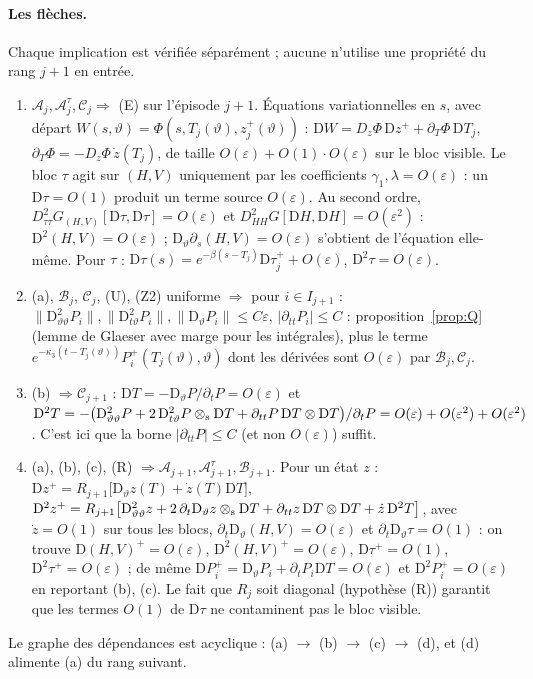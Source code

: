 \documentclass[11pt,a4paper]{article}
\theoremstyle{remark}
\newcommand{\vth}{\vartheta}
\newcommand{\D}{\mathrm D}
\begin{document}
\paragraph{Les flèches.} Chaque implication est vérifiée séparément ; aucune n'utilise une propriété du rang $j+1$ en entrée.
\begin{enumerate}[label=(\alph*),nosep]
\item $\mathcal A_j,\mathcal A^\tau_j,\mathcal C_j\Rightarrow$ (E) sur l'épisode $j+1$. Équations variationnelles en $s$, avec départ $W(s,\vth)=\Phi(s,T_j(\vth),z_j^+(\vth))$ : $\D W=D_z\Phi\,\D z^++\partial_T\Phi\,\D T_j$, $\partial_T\Phi=-D_z\Phi\,\dot z(T_j)$, de taille $O(\varepsilon)+O(1)\cdot O(\varepsilon)$ sur le bloc visible. Le bloc $\tau$ agit sur $(H,V)$ uniquement par les coefficients $\gamma_1,\lambda=O(\varepsilon)$ : un $\D\tau=O(1)$ produit un terme source $O(\varepsilon)$. Au second ordre, $D^2_{\tau\tau}G_{(H,V)}[\D\tau,\D\tau]=O(\varepsilon)$ et $D^2_{HH}G[\D H,\D H]=O(\varepsilon^2)$ : $\D^2(H,V)=O(\varepsilon)$ ; $\D_\vth\partial_s(H,V)=O(\varepsilon)$ s'obtient de l'équation elle-même. Pour $\tau$ : $\D\tau(s)=e^{-\beta(s-T_j)}\D\tau_j^++O(\varepsilon)$, $\D^2\tau=O(\varepsilon)$.
\item (a), $\mathcal B_j$, $\mathcal C_j$, (U), (Z2) uniforme $\Rightarrow$ pour $i\in I_{j+1}$ : $\lVert\D^2_{\vth\vth}P_i\rVert,\lVert\D^2_{t\vth}P_i\rVert,\lVert\D_\vth P_i\rVert\le C\varepsilon$, $\lvert\partial_{tt}P_i\rvert\le C$ : proposition~\ref{prop:Q} (lemme de Glaeser avec marge pour les intégrales), plus le terme $e^{-\kappa_3(t-T_j(\vth))}P_i^+(T_j(\vth),\vth)$ dont les dérivées sont $O(\varepsilon)$ par $\mathcal B_j,\mathcal C_j$.
\item (b) $\Rightarrow\mathcal C_{j+1}$ : $\D T=-\D_\vth P/\partial_tP=O(\varepsilon)$ et $\D^2T=-\bigl(\D^2_{\vth\vth}P+2\,\D^2_{t\vth}P\otimes_{\rm s}\D T+\partial_{tt}P\,\D T\otimes\D T\bigr)/\partial_tP=O(\varepsilon)+O(\varepsilon^2)+O(\varepsilon^2)$. C'est ici que la borne $\lvert\partial_{tt}P\rvert\le C$ (et non $O(\varepsilon)$) suffit.
\item (a), (b), (c), (R) $\Rightarrow\mathcal A_{j+1},\mathcal A^\tau_{j+1},\mathcal B_{j+1}$. Pour un état $z$ : $\D z^+=R_{j+1}\bigl[\D_\vth z(T)+\dot z(T)\D T\bigr]$, $\D^2z^+=R_{j+1}\bigl[\D^2_{\vth\vth}z+2\,\partial_t\D_\vth z\otimes_{\rm s}\D T+\partial_{tt}z\,\D T\otimes\D T+\dot z\,\D^2T\bigr]$, avec $\dot z=O(1)$ sur tous les blocs, $\partial_t\D_\vth(H,V)=O(\varepsilon)$ et $\partial_t\D_\vth\tau=O(1)$ : on trouve $\D(H,V)^+=O(\varepsilon)$, $\D^2(H,V)^+=O(\varepsilon)$, $\D\tau^+=O(1)$, $\D^2\tau^+=O(\varepsilon)$ ; de même $\D P_i^+=\D_\vth P_i+\partial_tP_i\D T=O(\varepsilon)$ et $\D^2P_i^+=O(\varepsilon)$ en reportant (b), (c). Le fait que $R_j$ soit diagonal (hypothèse (R)) garantit que les termes $O(1)$ de $\D\tau$ ne contaminent pas le bloc visible.
\end{enumerate}
Le graphe des dépendances est acyclique : (a) $\to$ (b) $\to$ (c) $\to$ (d), et (d) alimente (a) du rang suivant.
\end{document}
